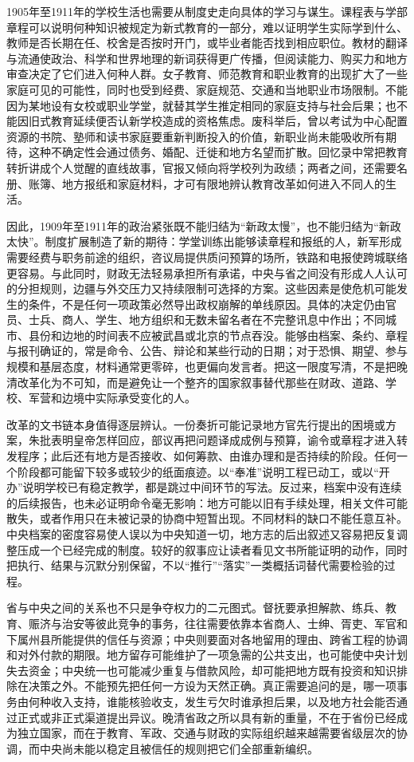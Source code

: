 1905年至1911年的学校生活也需要从制度史走向具体的学习与谋生。课程表与学部章程可以说明何种知识被规定为新式教育的一部分，难以证明学生实际学到什么、教师是否长期在任、校舍是否按时开门，或毕业者能否找到相应职位。教材的翻译与流通使政治、科学和世界地理的新词获得更广传播，但阅读能力、购买力和地方审查决定了它们进入何种人群。女子教育、师范教育和职业教育的出现扩大了一些家庭可见的可能性，同时也受到经费、家庭规范、交通和当地职业市场限制。不能因为某地设有女校或职业学堂，就替其学生推定相同的家庭支持与社会后果；也不能因旧式教育延续便否认新学校造成的资格焦虑。废科举后，曾以考试为中心配置资源的书院、塾师和读书家庭要重新判断投入的价值，新职业尚未能吸收所有期待，这种不确定性会通过债务、婚配、迁徙和地方名望而扩散。回忆录中常把教育转折讲成个人觉醒的直线故事，官报又倾向将学校列为政绩；两者之间，还需要名册、账簿、地方报纸和家庭材料，才可有限地辨认教育改革如何进入不同人的生活。

因此，1909年至1911年的政治紧张既不能归结为“新政太慢”，也不能归结为“新政太快”。制度扩展制造了新的期待：学堂训练出能够读章程和报纸的人，新军形成需要经费与职务前途的组织，咨议局提供质问预算的场所，铁路和电报使跨城联络更容易。与此同时，财政无法轻易承担所有承诺，中央与省之间没有形成人人认可的分担规则，边疆与外交压力又持续限制可选择的方案。这些因素是使危机可能发生的条件，不是任何一项政策必然导出政权崩解的单线原因。具体的决定仍由官员、士兵、商人、学生、地方组织和无数未留名者在不完整讯息中作出；不同城市、县份和边地的时间表不应被武昌或北京的节点吞没。能够由档案、条约、章程与报刊确证的，常是命令、公告、辩论和某些行动的日期；对于恐惧、期望、参与规模和基层态度，材料通常更零碎，也更偏向发言者。把这一限度写清，不是把晚清改革化为不可知，而是避免让一个整齐的国家叙事替代那些在财政、道路、学校、军营和边境中实际承受变化的人。

改革的文书链本身值得逐层辨认。一份奏折可能记录地方官先行提出的困境或方案，朱批表明皇帝怎样回应，部议再把问题译成成例与预算，谕令或章程才进入转发程序；此后还有地方是否接收、如何筹款、由谁办理和是否持续的阶段。任何一个阶段都可能留下较多或较少的纸面痕迹。以“奉准”说明工程已动工，或以“开办”说明学校已有稳定教学，都是跳过中间环节的写法。反过来，档案中没有连续的后续报告，也未必证明命令毫无影响：地方可能以旧有手续处理，相关文件可能散失，或者作用只在未被记录的协商中短暂出现。不同材料的缺口不能任意互补。中央档案的密度容易使人误以为中央知道一切，地方志的后出叙述又容易把反复调整压成一个已经完成的制度。较好的叙事应让读者看见文书所能证明的动作，同时把执行、结果与沉默分别保留，不以“推行”“落实”一类概括词替代需要检验的过程。

省与中央之间的关系也不只是争夺权力的二元图式。督抚要承担解款、练兵、教育、赈济与治安等彼此竞争的事务，往往需要依靠本省商人、士绅、胥吏、军官和下属州县所能提供的信任与资源；中央则要面对各地留用的理由、跨省工程的协调和对外付款的期限。地方留存可能维护了一项急需的公共支出，也可能使中央计划失去资金；中央统一也可能减少重复与借款风险，却可能把地方既有投资和知识排除在决策之外。不能预先把任何一方设为天然正确。真正需要追问的是，哪一项事务由何种收入支持，谁能核验收支，发生亏欠时谁承担后果，以及地方社会能否通过正式或非正式渠道提出异议。晚清省政之所以具有新的重量，不在于省份已经成为独立国家，而在于教育、军政、交通与财政的实际组织越来越需要省级层次的协调，而中央尚未能以稳定且被信任的规则把它们全部重新编织。

